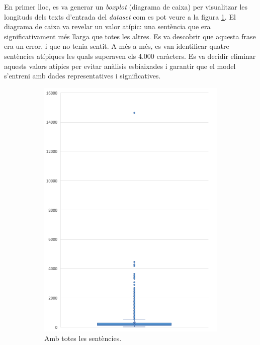 En primer lloc, es va generar un \textit{boxplot} (diagrama de caixa) per visualitzar les longituds dels texts d'entrada del \textit{dataset} com es pot veure a la figura \ref{fig:box_longitud_sentencies_tot}. El diagrama de caixa va revelar un valor atípic: una sentència que era significativament més llarga que totes les altres. Es va descobrir que aquesta frase era un error, i que no tenia sentit. A més a més, es van identificar quatre sentències atípiques les quals superaven els 4.000 caràcters. Es va decidir eliminar aquests valors atípics per evitar anàlisis esbiaixades i garantir que el model s'entreni amb dades representatives i significatives.

\begin{figure}[H]
  \centering
  \begin{subfigure}{.5\textwidth}
    \centering
    \includegraphics[width=.7\linewidth]{box_sent.png}
    \caption{Amb totes les sentències.}
    \label{fig:box_longitud_sentencies_tot}
  \end{subfigure}%
  \begin{subfigure}{.5\textwidth}
    \centering

\end{subfigure}
\end{figure}
